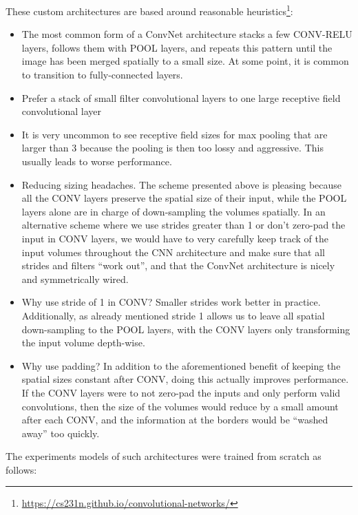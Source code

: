 These custom architectures are based around reasonable heuristics\footnote{\url{https://cs231n.github.io/convolutional-networks/}}:

\begin{itemize}
    \item The most common form of a ConvNet architecture stacks a few CONV-RELU layers, follows them with POOL layers, and repeats this pattern until the image has been merged spatially to a small size. At some point, it is common to transition to fully-connected layers.
    \item Prefer a stack of small filter convolutional layers to one large receptive field convolutional layer
    \item It is very uncommon to see receptive field sizes for max pooling that are larger than 3 because the pooling is then too lossy and aggressive. This usually leads to worse performance.
    \item Reducing sizing headaches. The scheme presented above is pleasing because all the CONV layers preserve the spatial size of their input, while the POOL layers alone are in charge of down-sampling the volumes spatially. In an alternative scheme where we use strides greater than 1 or don’t zero-pad the input in CONV layers, we would have to very carefully keep track of the input volumes throughout the CNN architecture and make sure that all strides and filters “work out”, and that the ConvNet architecture is nicely and symmetrically wired.
    \item Why use stride of 1 in CONV? Smaller strides work better in practice. Additionally, as already mentioned stride 1 allows us to leave all spatial down-sampling to the POOL layers, with the CONV layers only transforming the input volume depth-wise.
    \item Why use padding? In addition to the aforementioned benefit of keeping the spatial sizes constant after CONV, doing this actually improves performance. If the CONV layers were to not zero-pad the inputs and only perform valid convolutions, then the size of the volumes would reduce by a small amount after each CONV, and the information at the borders would be “washed away” too quickly.
\end{itemize}

The experiments models of such architectures were trained from scratch as follows:

